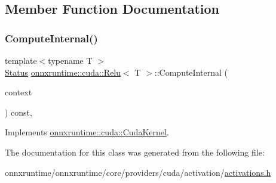\subsection{Member Function Documentation}
\mbox{\label{classonnxruntime_1_1cuda_1_1Relu_af1f9bdff79823d67d48c40e18d16c0ce}} 
\subsubsection{\texorpdfstring{Compute\+Internal()}{ComputeInternal()}}
{\footnotesize\ttfamily template$<$typename T $>$ \\
\mbox{\hyperlink{classonnxruntime_1_1common_1_1Status}{Status}} \mbox{\hyperlink{classonnxruntime_1_1cuda_1_1Relu}{onnxruntime\+::cuda\+::\+Relu}}$<$ T $>$\+::Compute\+Internal (\begin{DoxyParamCaption}\item[{\mbox{\hyperlink{classonnxruntime_1_1OpKernelContext}{Op\+Kernel\+Context}} $\ast$}]{context }\end{DoxyParamCaption}) const\hspace{0.3cm}{\ttfamily [override]}, {\ttfamily [virtual]}}



Implements \mbox{\hyperlink{classonnxruntime_1_1cuda_1_1CudaKernel_aca7af04ae448017d6023d30bba231ebb}{onnxruntime\+::cuda\+::\+Cuda\+Kernel}}.



The documentation for this class was generated from the following file\+:\begin{DoxyCompactItemize}
\item 
onnxruntime/onnxruntime/core/providers/cuda/activation/\mbox{\hyperlink{cuda_2activation_2activations_8h}{activations.\+h}}\end{DoxyCompactItemize}
